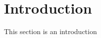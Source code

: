 \documentclass[11pt]{article}
\begin{document}
    \section{Introduction}

    This section is an introduction ~\cite{SimilarChessPositions}
    
    
\end{document}
